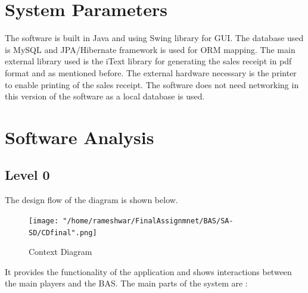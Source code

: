 \documentclass{scrreprt}
\begin{document}
\section{System Parameters}
The software is built in Java and using Swing library for GUI. The database used is MySQL and JPA/Hibernate framework is used for ORM mapping. The main external library used is the iText library for generating the sales receipt in pdf format and  as mentioned before.
The external hardware necessary is the printer to enable printing of the sales receipt. The software does not need networking in this version of the software as a local database is used. 

\section{Software Analysis}

\subsection{Level 0}

The design flow of the diagram is shown below.

\begin{figure}
\texttt{[image: "/home/rameshwar/FinalAssignmnet/BAS/SA-SD/CDfinal".png]}
\caption{Context Diagram}
\end{figure}

It provides the functionality of the application and shows interactions between the main players and the BAS.
The main parts of the system are :
\end{document}
